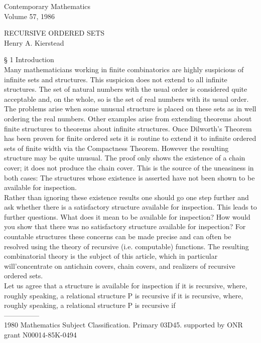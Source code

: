 \documentclass[twoside]{article}
\begin{document}
\thispagestyle{plain}
\begin{flushleft}
Contemporary Mathematics\\
Volume 57, 1986
\end{flushleft}







\begin{center}
RECURSIVE ORDERED SETS\\
Henry A. Kierstead
\end{center}
§ 1 Introduction\\
\indent
Many mathematicians working in finite combinatorics are highly suspicious of infinite sets and structures.   This suspicion does not extend to all infinite structures.   
The set of natural numbers with the usual order is considered quite acceptable and, on the whole, so is the set of real numbers with its usual order.   
The problems arise when some unusual structure is placed on these sets as in well ordering the real numbers.   
Other examples arise from extending theorems about finite structures to theorems about infinite   structures.    
Once Dilworth's Theorem has been proven for finite ordered sets it is routine to extend it to infinite ordered sets of finite width via the Compactness Theorem.   
However the resulting structure may be quite unusual.   
The proof only shows the existence of a chain cover; it does not produce the chain cover.   
This is the source of the uneasiness in both cases:    The structures whose existence is asserted have not been shown to be available for inspection.\\
\indent
Rather than ignoring these existence results one should go one step further and ask whether there is a satisfactory structure available for inspection. 
This leads to further questions. What does it mean to be available for inspection? 
How would you show that there was no satisfactory structure available for inspection? 
For countable structures these concerns can be made precise and can often be resolved using the theory of recursive (i.e. computable) functions.   
The resulting combinatorial theory is the subject of this article, which in particular will'concentrate on antichain covers, chain covers, and realizers of recursive ordered sets.\\
\indent
Let us agree that a structure is available for inspection if it is recursive, where, roughly speaking, a relational structure   P   is recursive if it is recursive, where, roughly speaking, a relational structure P is recursive if\\
\newline
---------------\\
1980 Mathematics Subject Classification. Primary 03D45. supported by ONR grant N00014-85K-0494
\newline
\end{document}
